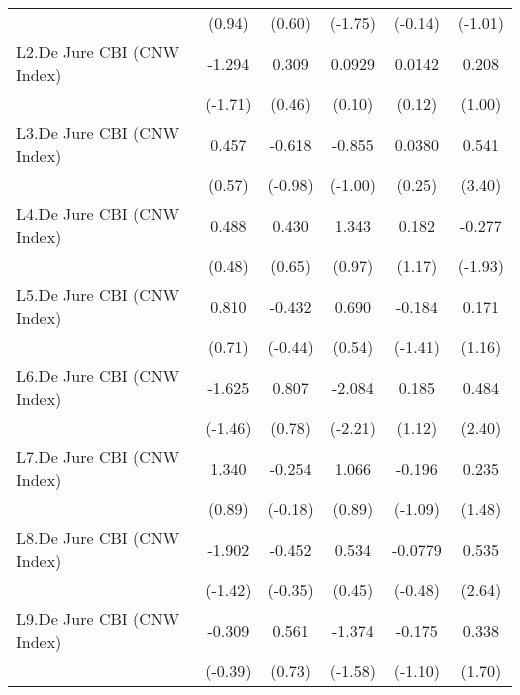 {\begin{longtable}{l*{5}{c}}
                &   (0.94)         &   (0.60)         &  (-1.75)         &  (-0.14)         &  (-1.01)         \\
[1em]
L2.De Jure CBI (CNW Index)&   -1.294         &    0.309         &   0.0929         &   0.0142         &    0.208         \\
                &  (-1.71)         &   (0.46)         &   (0.10)         &   (0.12)         &   (1.00)         \\
[1em]
L3.De Jure CBI (CNW Index)&    0.457         &   -0.618         &   -0.855         &   0.0380         &    0.541\sym{***}\\
                &   (0.57)         &  (-0.98)         &  (-1.00)         &   (0.25)         &   (3.40)         \\
[1em]
L4.De Jure CBI (CNW Index)&    0.488         &    0.430         &    1.343         &    0.182         &   -0.277         \\
                &   (0.48)         &   (0.65)         &   (0.97)         &   (1.17)         &  (-1.93)         \\
[1em]
L5.De Jure CBI (CNW Index)&    0.810         &   -0.432         &    0.690         &   -0.184         &    0.171         \\
                &   (0.71)         &  (-0.44)         &   (0.54)         &  (-1.41)         &   (1.16)         \\
[1em]
L6.De Jure CBI (CNW Index)&   -1.625         &    0.807         &   -2.084\sym{*}  &    0.185         &    0.484\sym{*}  \\
                &  (-1.46)         &   (0.78)         &  (-2.21)         &   (1.12)         &   (2.40)         \\
[1em]
L7.De Jure CBI (CNW Index)&    1.340         &   -0.254         &    1.066         &   -0.196         &    0.235         \\
                &   (0.89)         &  (-0.18)         &   (0.89)         &  (-1.09)         &   (1.48)         \\
[1em]
L8.De Jure CBI (CNW Index)&   -1.902         &   -0.452         &    0.534         &  -0.0779         &    0.535\sym{**} \\
                &  (-1.42)         &  (-0.35)         &   (0.45)         &  (-0.48)         &   (2.64)         \\
[1em]
L9.De Jure CBI (CNW Index)&   -0.309         &    0.561         &   -1.374         &   -0.175         &    0.338         \\
                &  (-0.39)         &   (0.73)         &  (-1.58)         &  (-1.10)         &   (1.70)         \\

\end{longtable}}
